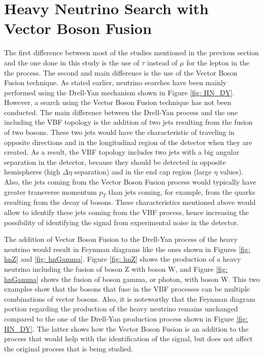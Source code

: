\section{Heavy Neutrino Search with Vector Boson Fusion}

The first difference between most of the studies mentioned in the previous section and the one done in this study is the use of $\tau$ instead of $\mu$ for the lepton in the the process. The second and main difference is the use of the Vector Boson Fusion technique. As stated earlier, neutrino searches have been mainly performed using the Drell-Yan mechanism shown in Figure \ref{fig: HN_DY}. However, a search using the Vector Boson Fusion technique has not been conducted. The main difference between the Drell-Yan process and the one including the VBF topology is the addition of two jets resulting from the fusion of two bosons. These two jets would have the characteristic of traveling in opposite directions and in the longitudinal region of the detector when they are created. As a result, the VBF topology includes two jets with a big angular separation in the detector, because they should be detected in opposite hemispheres (high $\Delta \eta$ separation) and in the end cap region (large $\eta$ values). Also, the jets coming from the Vector Boson Fusion process would typically have greater transverse momentum $p_{T}$ than jets coming, for example, from the quarks resulting from the decay of bosons. These characteristics mentioned above would allow to identify these jets coming from the VBF process, hence increasing the possibility of identifying the signal from experimental noise in the detector.

The addition of Vector Boson Fusion to the Drell-Yan process of the heavy neutrino would result in Feynman diagrams like the ones shown in Figures \ref{fig: hnZ} and \ref{fig: hnGamma}. Figure \ref{fig: hnZ} shows the production of a heavy neutrino including the fusion of boson Z with boson W, and Figure \ref{fig: hnGamma} shows the fusion of boson gamma, or photon, with boson W. This two examples show that the bosons that fuse in the VBF processes can be multiple combinations of vector bosons. Also, it is noteworthy that the Feynman diagram portion regarding the production of the heavy neutrino remains unchanged compared to the one of the Drell-Yan production process shown in Figure \ref{fig: HN_DY}. The latter shows how the Vector Boson Fusion is an addition to the process that would help with the identification of the signal, but does not affect the original process that is being studied. 

